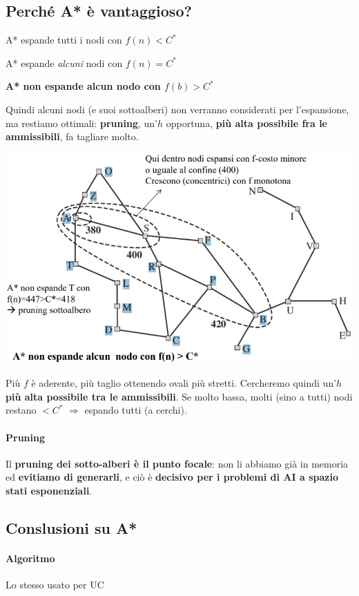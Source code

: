 \documentclass[10pt]{book}
\begin{document}
\subsection{Perché A* è vantaggioso?}
\begin{list}{}{}
	\item A* espande tutti i nodi con $f(n) < C^*$
	\item A* espande \textit{alcuni} nodi con $f(n) = C^*$
	\item \textbf{A* non espande alcun nodo con $f(b) > C^*$}
\end{list}
Quindi alcuni nodi (e suoi sottoalberi) non verranno considerati per l'espansione, ma restiamo ottimali: \textbf{pruning}, un'$h$ opportuna, \textbf{più alta possibile fra le ammissibili}, fa tagliare molto.
\pagebreak
\begin{center}
	\includegraphics[scale=0.7]{astarcontorni.png}
\end{center}
Più $f$ è aderente, più taglio ottenendo ovali più stretti. Cercheremo quindi un'$h$ \textbf{più alta possibile tra le ammissibili}. Se molto bassa, molti (sino a tutti) nodi restano $< C^*$ $\Rightarrow$ espando tutti (a cerchi).
\paragraph{Pruning} Il \textbf{pruning dei sotto-alberi è il punto focale}: non li abbiamo già in memoria ed \textbf{evitiamo di generarli}, e ciò è \textbf{decisivo per i problemi di AI a spazio stati esponenziali}.
\subsection{Conslusioni su A*}
\paragraph{Algoritmo} Lo stesso usato per UC
\end{document}
